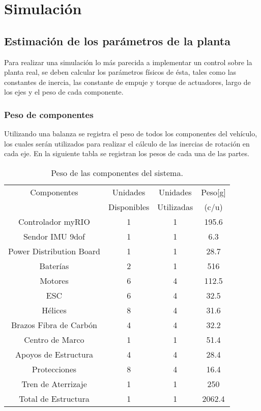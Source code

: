 \documentclass[../main.tex]{subfiles}
\begin{document}
\chapter{Simulación}\label{Simulacion}

\section{\noindent Estimación de los parámetros de la planta}

Para realizar una simulación lo más parecida a implementar un control
sobre la planta real, se deben calcular los parámetros físicos de
ésta, tales como las constantes de inercia, las constante de empuje
y torque de actuadores, largo de los ejes y el peso de cada componente. 


\subsection{Peso de componentes}

Utilizando una balanza se registra el peso de todos los componentes
del vehículo, los cuales serán utilizados para realizar el cálculo
de las inercias de rotación en cada eje. En la siguiente tabla se
registran los pesos de cada una de las partes.



\begin{table}
\begin{centering}
\begin{tabular}{|c|c|c|c|}
\hline 
Componentes  & Unidades & Unidades  & Peso{[}g{]}\tabularnewline
 & Disponibles & Utilizadas & (c/u)\tabularnewline
\hline 
\hline 
Controlador myRIO & 1 & 1 & 195.6\tabularnewline
\hline 
Sendor IMU 9dof & 1 & 1 & 6.3\tabularnewline
\hline 
Power Distribution Board & 1 & 1 & 28.7\tabularnewline
\hline 
Baterías  & 2 & 1 & 516\tabularnewline
\hline 
Motores & 6 & 4 & 112.5\tabularnewline
\hline 
ESC & 6 & 4 & 32.5\tabularnewline
\hline 
Hélices  & 8 & 4 & 31.6\tabularnewline
\hline 
Brazos Fibra de Carbón & 4 & 4 & 32.2\tabularnewline
\hline 
Centro de Marco & 1 & 1 & 51.4\tabularnewline
\hline 
Apoyos de Estructura & 4 & 4 & 28.4\tabularnewline
\hline 
Protecciones & 8 & 4 & 16.4\tabularnewline
\hline 
Tren de Aterrizaje & 1 & 1 & 250\tabularnewline
\hline 
Total de Estructura & 1 & 1 & 2062.4\tabularnewline
\hline  
\end{tabular}
\par\end{centering}
\caption{Peso de las componentes del sistema.}
\end{table}
\end{document}
